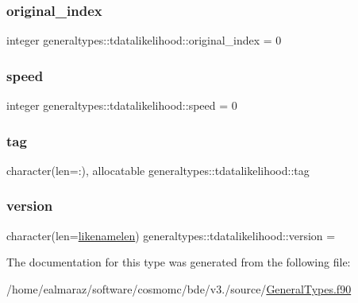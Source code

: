 \subsubsection{\texorpdfstring{original\+\_\+index}{original\_index}}
{\footnotesize\ttfamily integer generaltypes\+::tdatalikelihood\+::original\+\_\+index = 0\hspace{0.3cm}{\ttfamily [private]}}

\mbox{\label{structgeneraltypes_1_1tdatalikelihood_a9ec1130646897e847fefe2bdc33f549e}} 
\subsubsection{\texorpdfstring{speed}{speed}}
{\footnotesize\ttfamily integer generaltypes\+::tdatalikelihood\+::speed = 0\hspace{0.3cm}{\ttfamily [private]}}

\mbox{\label{structgeneraltypes_1_1tdatalikelihood_a267cb471268d2fbce4e36abc77751b30}} 
\subsubsection{\texorpdfstring{tag}{tag}}
{\footnotesize\ttfamily character(len=\+:), allocatable generaltypes\+::tdatalikelihood\+::tag\hspace{0.3cm}{\ttfamily [private]}}

\mbox{\label{structgeneraltypes_1_1tdatalikelihood_a06e1ceca8ba822d79c38cb6d1a69e713}} 
\subsubsection{\texorpdfstring{version}{version}}
{\footnotesize\ttfamily character(len=\mbox{\hyperlink{namespacegeneraltypes_ace8a6f4c868858b72f97b45b87312845}{likenamelen}}) generaltypes\+::tdatalikelihood\+::version = \textquotesingle{}\textquotesingle{}\hspace{0.3cm}{\ttfamily [private]}}



The documentation for this type was generated from the following file\+:\begin{DoxyCompactItemize}
\item 
/home/ealmaraz/software/cosmomc/bde/v3./source/\mbox{\hyperlink{GeneralTypes_8f90}{General\+Types.\+f90}}\end{DoxyCompactItemize}
